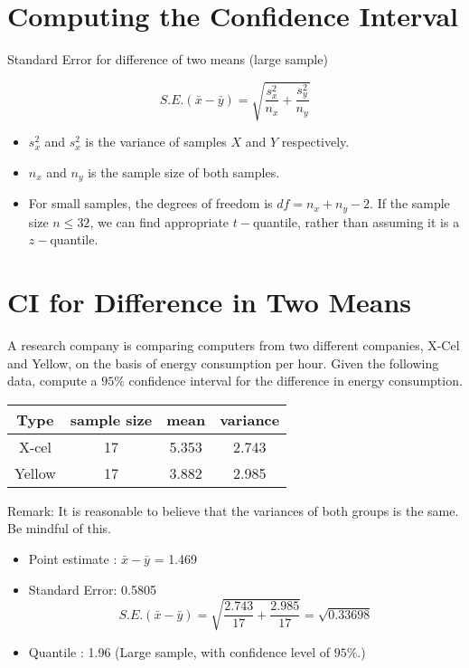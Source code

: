 \documentclass[]{report}
\begin{document}
	
	
	\section{Computing the Confidence Interval}
	Standard Error for difference of two means (large sample)
	
	\[ S.E.(\bar{x}-\bar{y}) = \sqrt{\frac{s^2_x}{n_x} + \frac{s^2_y}{n_y}} \]
	
	\begin{itemize}
		\item $s^2_x$ and $s^2_x$ is the variance of samples $X$ and $Y$ respectively.
		\item $n_x$ and $n_y$ is the sample size of both samples.\bigskip
		
		\item For small samples, the degrees of freedom is $df = n_x + n_y - 2$. If the sample size $n \leq 32$, we can find appropriate $t-$quantile, rather than assuming it is a $z-$quantile.
	\end{itemize}
	
	
	
	\section{CI for Difference in Two Means}
	A research company is comparing computers from two different companies, X-Cel and Yellow, on the basis of energy consumption per hour. Given the following data, compute a $95\%$ confidence interval for the difference in energy consumption.
	\begin{center}
		\begin{tabular}{|c|c|c|c|}
			\hline
			Type & sample size & mean & variance \\ \hline
			X-cel & 17 & 5.353 & 2.743 \\ \hline
			Yellow & 17 & 3.882 & 2.985 \\ \hline
		\end{tabular}
	\end{center}
	Remark: It is reasonable to believe that the variances of both groups is the same. Be mindful of this.
	
	
	
	\begin{itemize}
		\item Point estimate : $\bar{x} - \bar{y}$ = 1.469
		\item Standard Error: 0.5805
		\[ S.E.(\bar{x}-\bar{y}) = \sqrt{\frac{2.743}{17} + \frac{2.985}{17}} = \sqrt{0.33698} \]
		\item Quantile : 1.96 (Large sample, with confidence level of $95\%$.)
	\end{itemize}
	
\end{document}
